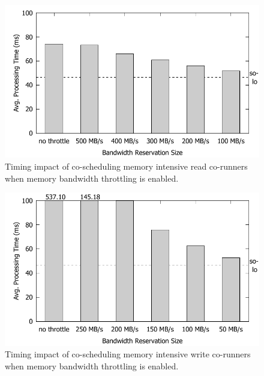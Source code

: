\begin{figure}[h]
  \centering
  \includegraphics[width=.45\textwidth]{figs/memguard_bandwidth}
  \caption{Timing impact of co-scheduling memory intensive read
co-runners when memory bandwidth throttling is enabled. }
  \label{fig:memguard_bandwidth}
\end{figure}

\begin{figure}[h]
  \centering
  \includegraphics[width=.45\textwidth]{figs/memguard_bwwrite}
  \caption{Timing impact of co-scheduling memory intensive write
co-runners when memory bandwidth throttling is enabled. }
  \label{fig:memguard_bwwrite}
\end{figure}

